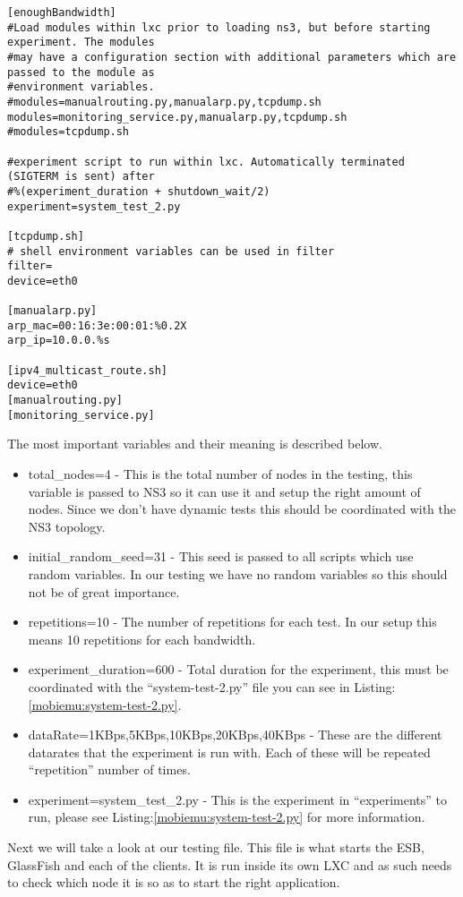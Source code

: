 \begin{lstlisting}[frame=single, caption={Setting.cfg}, label=mobiemu:setting.cfg, breaklines=true]
[enoughBandwidth]
#Load modules within lxc prior to loading ns3, but before starting experiment. The modules
#may have a configuration section with additional parameters which are passed to the module as
#environment variables.
#modules=manualrouting.py,manualarp.py,tcpdump.sh
modules=monitoring_service.py,manualarp.py,tcpdump.sh
#modules=tcpdump.sh

#experiment script to run within lxc. Automatically terminated (SIGTERM is sent) after
#%(experiment_duration + shutdown_wait/2)
experiment=system_test_2.py

[tcpdump.sh]
# shell environment variables can be used in filter
filter=
device=eth0

[manualarp.py]
arp_mac=00:16:3e:00:01:%0.2X
arp_ip=10.0.0.%s

[ipv4_multicast_route.sh]
device=eth0
[manualrouting.py]
[monitoring_service.py]
\end{lstlisting}

The most important variables and their meaning is described below.

\begin{itemize}
\item total\_nodes=4 - This is the total number of nodes in the testing, this variable is passed to NS3 so it can use it and setup the right amount of nodes. Since we don’t have dynamic tests this should be coordinated with the NS3 topology.
\item initial\_random\_seed=31 - This seed is passed to all scripts which use random variables. In our testing we have no random variables so this should not be of great importance.
\item repetitions=10 - The number of repetitions for each test. In our setup this means 10 repetitions for each bandwidth.
\item experiment\_duration=600 - Total duration for the experiment, this must be coordinated with the “system-test-2.py” file you can see in Listing:\ref{mobiemu:system-test-2.py}.
\item dataRate=1KBps,5KBps,10KBps,20KBps,40KBps - These are the different datarates that the experiment is run with. Each of these will be repeated “repetition” number of times.
\item experiment=system\_test\_2.py - This is the experiment in “experiments” to run, please see Listing:\ref{mobiemu:system-test-2.py} for more information.
\end{itemize}

Next we will take a look at our testing file. This file is what starts the ESB, GlassFish and each of the clients. It is run inside its own LXC and as such needs to check which node it is so as to start the right application.

